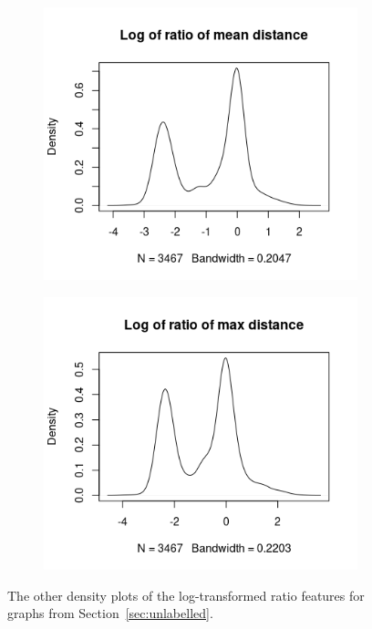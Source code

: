\documentclass{l4proj}
\theoremstyle{definition}
\theoremstyle{remark}
\begin{document}
\begin{figure}
\begin{subfigure}[t]{0.49\textwidth}
    \centering
    \includegraphics[width=\textwidth]{images/sip_ratio_meandist.png}
  \end{subfigure}
  \begin{subfigure}[t]{0.49\textwidth}
    \centering
    \includegraphics[width=\textwidth]{images/sip_ratio_maxdist.png}
  \end{subfigure}
  \caption{The other density plots of the log-transformed ratio features for
    graphs from Section~\ref{sec:unlabelled}.}
  \label{fig:sip_ratio}
\end{figure}
\end{document}
